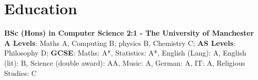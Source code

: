 \documentclass[10pt]{article} %
\begin{document}

\section{Education}

\textbf{BSc (Hons) in Computer Science 2:1 - The University of Manchester}
\\
\textbf{A Levels}: Maths A, Computing B, physics B, Chemistry C;
\textbf{AS Levels}: Philosophy D;
\textbf{GCSE}:
   Maths: A*,
   Statistics: A*,
   English (Lang): A,
   English (lit): B,
   Science (double award): AA,
   Music: A,
   German: A,
   IT: A,
   Religious Studies: C



\end{document}
